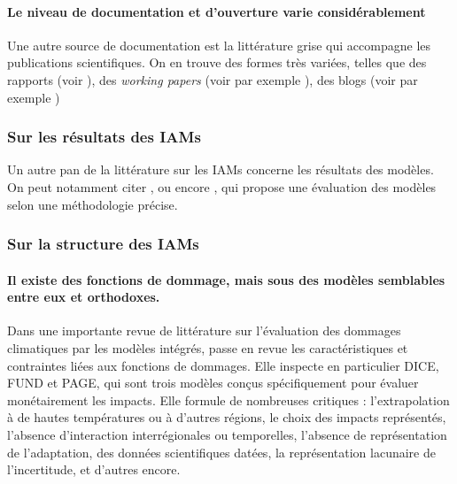 \paragraph{Le niveau de documentation et d'ouverture varie considérablement}

Une autre source de documentation est la littérature grise qui accompagne les publications scientifiques. On en trouve des formes très variées, telles que des rapports (voir \autocite{medeas_guiding_2019, asbjorn_aaheim_grace_2018, european_commission_ginfors-e_2022, european_commission_gem-e3_2013, nordhaus_dice_2013}), des \emph{working papers} (voir par exemple \autocite{dafermos_stock-flow-fund_2017, giraud_coping_2016, calvin_gcam_2019, bosetti_witch_2006, ghersi_imaclim-p_2014}), des blogs (voir par exemple \autocite{tol_fund_nodate})


\subsubsection{Sur les résultats des IAMs}

Un autre pan de la littérature sur les IAMs concerne les résultats des modèles. On peut notamment citer \autocite{howard_few_2017, keppo_exploring_2021}, ou encore \autocite{harmsen_integrated_2021}, qui propose une évaluation des modèles selon une méthodologie précise. 





\subsubsection{Sur la structure des IAMs }

\paragraph{Il existe des fonctions de dommage, mais sous des modèles semblables entre eux et orthodoxes.}

Dans une importante revue de littérature sur l'évaluation des dommages climatiques par les modèles intégrés, \textcite{diaz_quantifying_2017} passe en revue les caractéristiques et contraintes liées aux fonctions de dommages. Elle inspecte en particulier DICE, FUND et PAGE, qui sont trois modèles conçus spécifiquement pour évaluer monétairement les impacts. Elle formule de nombreuses critiques : l'extrapolation à de hautes températures ou à d'autres régions, le choix des impacts représentés, l'absence d'interaction interrégionales ou temporelles, l'absence de représentation de l'adaptation, des données scientifiques datées, la représentation lacunaire de l'incertitude, et d'autres encore. 

